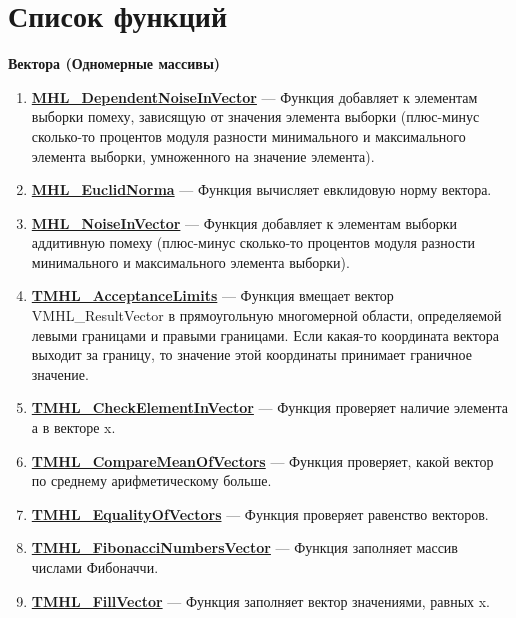 \documentclass[a4paper,12pt]{article}
\begin{document}
\section{Список функций}\label{section_listfunctions}
\textbf{Вектора (Одномерные массивы)}
\begin{enumerate}

\item \textbf{\hyperref[MHL_DependentNoiseInVector]{MHL\_DependentNoiseInVector}} --- Функция добавляет к элементам выборки помеху, зависящую от значения элемента выборки (плюс-минус сколько-то процентов модуля разности минимального и максимального элемента выборки, умноженного на значение элемента).

\item \textbf{\hyperref[MHL_EuclidNorma]{MHL\_EuclidNorma}} --- Функция вычисляет евклидовую норму вектора.

\item \textbf{\hyperref[MHL_NoiseInVector]{MHL\_NoiseInVector}} --- Функция добавляет к элементам выборки аддитивную помеху (плюс-минус сколько-то процентов модуля разности минимального и максимального элемента выборки).

\item \textbf{\hyperref[TMHL_AcceptanceLimits]{TMHL\_AcceptanceLimits}} --- Функция вмещает вектор VMHL\_ResultVector в прямоугольную многомерной области, определяемой левыми границами и правыми границами. Если какая-то координата вектора выходит за границу, то значение этой координаты принимает граничное значение.

\item \textbf{\hyperref[TMHL_CheckElementInVector]{TMHL\_CheckElementInVector}} --- Функция проверяет наличие элемента а в векторе x.

\item \textbf{\hyperref[TMHL_CompareMeanOfVectors]{TMHL\_CompareMeanOfVectors}} --- Функция проверяет, какой вектор по среднему арифметическому больше.

\item \textbf{\hyperref[TMHL_EqualityOfVectors]{TMHL\_EqualityOfVectors}} --- Функция проверяет равенство векторов.

\item \textbf{\hyperref[TMHL_FibonacciNumbersVector]{TMHL\_FibonacciNumbersVector}} --- Функция заполняет массив числами Фибоначчи.

\item \textbf{\hyperref[TMHL_FillVector]{TMHL\_FillVector}} --- Функция заполняет вектор значениями, равных x.


\end{enumerate}
\end{document}
